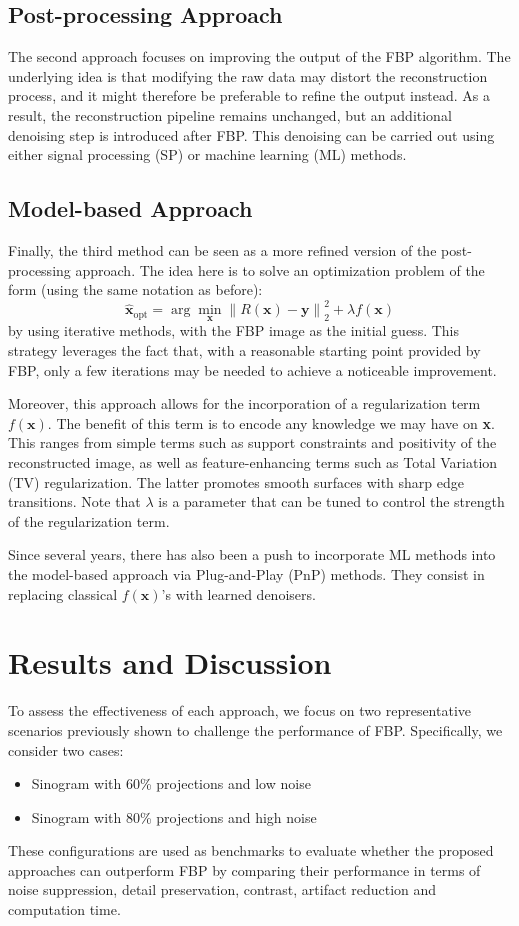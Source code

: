 \documentclass{article}
\begin{document}
\subsection*{Post-processing Approach}
The second approach focuses on improving the output of the FBP algorithm. The underlying idea is that modifying the raw data may distort the reconstruction process, and it might therefore be preferable to refine the output instead. As a result, the reconstruction pipeline remains unchanged, but an additional denoising step is introduced after FBP. This denoising can be carried out using either signal processing (SP) or machine learning (ML) methods.
\subsection*{Model-based Approach}
Finally, the third method can be seen as a more refined version of the post-processing approach. The idea here is to solve an optimization problem of the form (using the same notation as before):
$$
\hat{\mathbf{x}}_{\mathrm{opt}} = \arg\min_{\mathbf{x}} \left\| R(\mathbf{x}) - \mathbf{y} \right\|_2^2 + \lambda f(\mathbf{x})
$$
by using iterative methods, with the FBP image as the initial guess. This strategy leverages the fact that, with a reasonable starting point provided by FBP, only a few iterations may be needed to achieve a noticeable improvement.
\medskip

Moreover, this approach allows for the incorporation of a regularization term $f(\mathbf{x})$. The benefit of this term is to encode any knowledge we may have on \textbf{x}. This ranges from simple terms such as support constraints and positivity of the reconstructed image, as well as feature-enhancing terms such as Total Variation (TV) regularization. The latter promotes smooth surfaces with sharp edge transitions. Note that $\lambda$ is a parameter that can be tuned to control the strength of the regularization term.
\smallskip

Since several years, there has also been a push to incorporate ML methods into the model-based approach via Plug-and-Play (PnP) methods.
They consist in replacing classical $f(\mathbf{x})$'s with learned denoisers.

\section{Results and Discussion}
To assess the effectiveness of each approach, we focus on two representative scenarios previously shown to challenge the performance of FBP. Specifically, we consider two cases: 
\begin{itemize}
    \item Sinogram with 60\% projections and low noise
    \item Sinogram with 80\% projections and high noise
\end{itemize}
  These configurations are used as benchmarks to evaluate whether the proposed approaches can outperform FBP by comparing their performance in terms of noise suppression, detail preservation, contrast, artifact reduction and computation time. 
\end{document}

